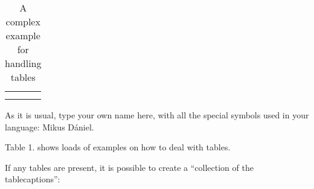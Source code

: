 \documentclass{article}
\begin{document}
\begin{table}[]
    \caption{A complex example for handling tables}
    \centering
    \begin{tabular}{|c|c|}
         &  \\
         & 
    \end{tabular}
    \label{tab:my_label}
\end{table}
\par
As it is usual, type your own name here, with all the special symbols used in your language: Mikus Dániel. \par
Table 1. shows loads of examples on how to deal with tables. \par
If any tables are present, it is possible to create a “collection of the tablecaptions”:
\listoftables
\end{document}
